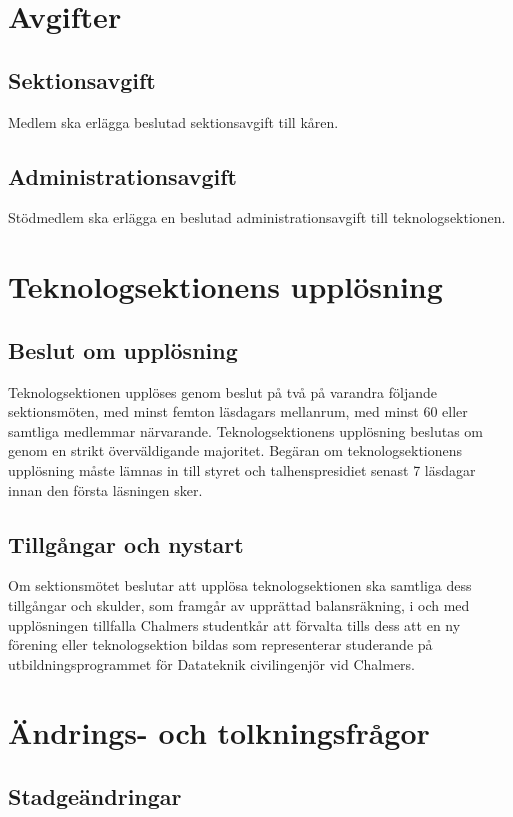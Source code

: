 \documentclass[a4paper]{dtek}
\begin{document}
\section{Avgifter}
\subsection{Sektionsavgift}
Medlem ska erlägga beslutad sektionsavgift till kåren.
\subsection{Administrationsavgift}
Stödmedlem ska erlägga en beslutad administrationsavgift till teknologsektionen.
\newpage

\section{Teknologsektionens upplösning}
\subsection{Beslut om upplösning}
Teknologsektionen upplöses genom beslut på två på varandra följande sektionsmöten, med minst femton läsdagars mellanrum, med minst 60 eller samtliga medlemmar närvarande.
Teknologsektionens upplösning beslutas om genom en strikt överväldigande majoritet.
Begäran om teknologsektionens upplösning måste lämnas in till styret och talhenspresidiet senast 7 läsdagar innan den första läsningen sker.
\subsection{Tillgångar och nystart}
Om sektionsmötet beslutar att upplösa teknologsektionen ska samtliga dess tillgångar och skulder, som framgår av upprättad balansräkning, i och med upplösningen tillfalla Chalmers studentkår att förvalta tills dess att en ny förening eller teknologsektion bildas som representerar studerande på utbildningsprogrammet för Datateknik civilingenjör vid Chalmers.
\newpage

\section{Ändrings- och tolkningsfrågor}
\subsection{Stadgeändringar}
\end{document}
